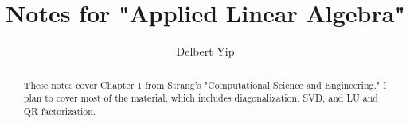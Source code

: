 \documentclass[]{article}
\title{Notes for "Applied Linear Algebra"}
\author{Delbert Yip}
\begin{document}
\maketitle

\begin{abstract}
	These notes cover Chapter 1 from Strang's "Computational Science and Engineering." I plan to cover most of the material, which includes diagonalization, SVD, and LU and QR factorization.
\end{abstract}

\section{}
\end{document}
